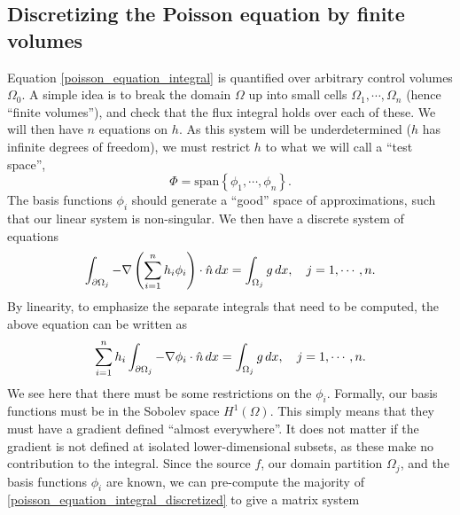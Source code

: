 \subsection{Discretizing the Poisson equation by finite volumes}\label{discretizing_poisson}
Equation \eqref{poisson_equation_integral} is quantified over arbitrary control volumes $\Omega_0$.
A simple idea is to break the domain $\Omega$ up into small cells $\Omega_1,\cdots,\Omega_n$ (hence ``finite volumes''), and check that the flux integral holds over each of these.
We will then have $n$ equations on $h$. As this system will be underdetermined ($h$ has infinite degrees of freedom), we must
restrict $h$ to what we will call a ``test space'',
    $$\Phi = \text{span}\left\{\phi_1,\cdots,\phi_n\right\}.$$
The basis functions $\phi_i$ should generate a ``good'' space of approximations,
such that our linear system is non-singular.
We then have a discrete system of equations
\begin{align*}
    \int_{{\partial\Omega}_j} -\nabla \left(\sum_{i=1}^n h_i\phi_i\right)\cdot \hat{n}\,dx = \int_{{\Omega}_j} g\,dx,\quad j=1,\cdots,n.
\end{align*}
By linearity, to emphasize the separate integrals that need to be computed, the above equation can be written as
\begin{equation}\label{poisson_equation_integral_discretized}
    \sum_{i=1}^n h_i\int_{{\partial\Omega}_j} -\nabla \phi_i \cdot \hat{n}\,dx = \int_{{\Omega}_j} g\,dx,\quad j=1,\cdots,n.
\end{equation}
We see here that there must be some restrictions on the $\phi_i$.
Formally, our basis functions must be in the Sobolev space $H^1(\Omega)$. This simply means that they must have a gradient defined ``almost everywhere''.
It does not matter if the gradient is not defined at isolated lower-dimensional subsets, as these make no contribution to
the integral. Since the source $f$, our domain partition $\Omega_j$, and the basis functions $\phi_i$ are known, we can pre-compute
the majority of \eqref{poisson_equation_integral_discretized} to give a matrix system

